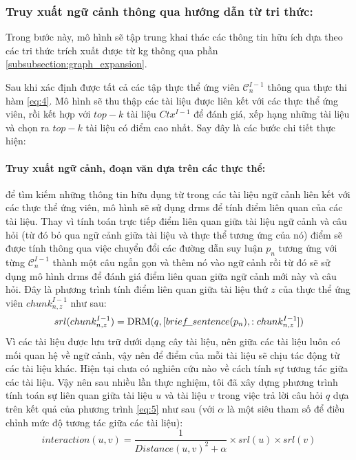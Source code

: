 \subsubsection{Truy xuất ngữ cảnh thông qua hướng dẫn từ tri thức:}


Trong bước này, mô hình sẽ tập trung khai thác các thông tin hữu ích dựa theo các tri thức trích xuất được từ \gls{kg} thông qua phần \ref{subsubsection:graph_expansion}.


Sau khi xác định được tất cả các tập thực thể  ứng viên $\mathcal{C}^{I - 1}_n$ thông qua thực thi hàm \ref{eq:4}. Mô hình sẽ thu thập các tài liệu được liên kết với các thực thể ứng viên, rồi kết hợp với $top-k$ tài liệu $Ctx^{I - 1}$ để đánh giá, xếp hạng những tài liệu và chọn ra $top-k$ tài liệu có điểm cao nhất. Say đây là các bước chi tiết thực hiện:
\paragraph{Truy xuất ngữ cảnh, đoạn văn dựa trên các thực thể:}
để tìm kiếm những thông tin hữu dụng từ trong các tài liệu ngữ cảnh liên kết với các thực thể ứng viên, mô hình sẽ sử dụng \gls{drms} để tính điểm liên quan của các tài liệu. Thay vì tính toán trực tiếp điểm liên quan giữa tài liệu ngữ cảnh và câu hỏi (từ đó bỏ qua ngữ cảnh giữa tài liệu và thực thể tương ứng của nó) điểm sẽ được tính thông qua việc chuyển đổi các đường dẫn suy luận $p_n$ tương ứng với từng $\mathcal{C}^{I - 1}_n$  thành một câu ngắn gọn và thêm nó vào ngữ cảnh rồi từ đó sẽ sử dụng mô hình \gls{drms} để đánh giá điểm liên quan giữa ngữ cảnh mới này và câu hỏi. Đây là phương trình tính điểm liên quan giữa tài liệu thứ $z$ của thực thể ứng viên $chunk^{I-1}_{n,z}$ như sau:
\begin{equation}
    srl(chunk^{I-1}_{n,z}) = \text{DRM}(q, [brief\hspace{-0.1cm}\_sentence(p_n), :chunk^{I-1}_{n,z}])
    \label{eq:5}
\end{equation}
Vì các tài liệu được lưu trữ dưới dạng cây tài liệu, nên giữa các tài liệu luôn có mối quan hệ về ngữ cảnh, vậy nên để điểm của mỗi tài liệu sẽ chịu tác động từ các tài liệu khác. Hiện tại chưa có nghiên cứu nào về cách tính sự tương tác giữa các tài liệu. Vậy nên sau nhiều lần thực nghiệm, tôi đã xây dựng phương trình tính toán sự liên quan giữa tài liệu $u$ và tài liệu $v$ trong việc trả lời câu hỏi $q$ dựa trên kết quả của phương trình \ref{eq:5} như sau (với $\alpha$ là một siêu tham số để điều chỉnh mức độ tương tác giữa các tài liệu):
\begin{equation}
    interaction(u,v) = \dfrac{1}{Distance(u, v)^2 + \alpha} \times srl(u) \times srl(v)
    \label{eq:6}
\end{equation}
